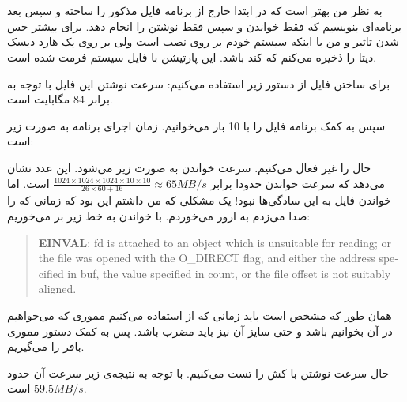 \section{}
به نظر من بهتر است که در ابتدا خارج از برنامه فایل مذکور را ساخته و سپس بعد برنامه‌ای بنویسیم که فقط خواندن و سپس
فقط نوشتن را انجام دهد. برای بیشتر حس شدن تاثیر
 و 
من با اینکه سیستم خودم بر روی
نصب است ولی بر روی یک هارد دیسک دیتا را ذخیره می‌کنم که کند باشد. این پارتیشن با فایل سیستم
فرمت شده است.

برای ساختن فایل از دستور زیر استفاده می‌کنیم:
سرعت نوشتن این فایل با توجه به
برابر 84 مگابایت است.

سپس به کمک برنامه فایل را با
10 بار می‌خوانیم.
زمان اجرای برنامه به صورت زیر است:

حال
را غیر فعال می‌کنیم. سرعت خواندن به صورت زیر می‌شود. این عدد نشان می‌دهد که سرعت خواندن حدودا برابر
$\frac{1024 \times 1024 \times 1024 \times 10 \times 10}{26 \times 60 + 16} \approx 65 MB/s$
است.
اما خواندن فایل به این سادگی‌ها نبود! یک مشکلی که من داشتم این بود که زمانی که
را صدا می‌زدم به ارور
می‌خوردم. با خواندن
به خط زیر بر می‌خوریم:
\begin{latin}
\begin{quote}
    \textbf{EINVAL}: fd is attached to an object which is unsuitable for reading; or the file was opened with the O\_DIRECT flag, and either the address specified in buf,
    the value specified in count, or the file offset is not suitably aligned.
\end{quote}
\end{latin}
همان طور که مشخص است باید زمانی که از
استفاده می‌کنیم مموری که می‌خواهیم در آن بخوانیم
باشد و حتی سایز آن نیز باید مضرب  باشد. پس به کمک دستور
مموری بافر را می‌گیریم.

حال سرعت نوشتن با کش را تست می‌کنیم. با توجه به نتیجه‌ی زیر سرعت آن حدود
$59.5 MB/s$
است.

